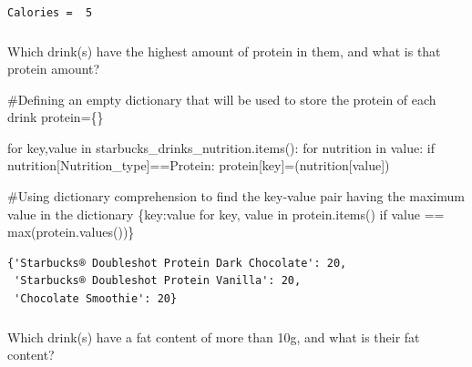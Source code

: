 \documentclass[
  letterpaper,
  DIV=11,
  numbers=noendperiod]{scrreprt}
\newenvironment{Shaded}{\begin{snugshade}}{\end{snugshade}}
\newcommand{\BuiltInTok}[1]{\textcolor[rgb]{0.00,0.23,0.31}{#1}}
\newcommand{\CommentTok}[1]{\textcolor[rgb]{0.37,0.37,0.37}{#1}}
\newcommand{\ControlFlowTok}[1]{\textcolor[rgb]{0.00,0.23,0.31}{#1}}
\newcommand{\KeywordTok}[1]{\textcolor[rgb]{0.00,0.23,0.31}{#1}}
\newcommand{\NormalTok}[1]{\textcolor[rgb]{0.00,0.23,0.31}{#1}}
\newcommand{\OperatorTok}[1]{\textcolor[rgb]{0.37,0.37,0.37}{#1}}
\newcommand{\StringTok}[1]{\textcolor[rgb]{0.13,0.47,0.30}{#1}}
\begin{document}
\begin{verbatim}
Calories =  5
\end{verbatim}

\hypertarget{section-17}{%
\subsubsection{}\label{section-17}}

Which drink(s) have the highest amount of protein in them, and what is
that protein amount?

\begin{Shaded}
\begin{Highlighting}[]
\CommentTok{\#Defining an empty dictionary that will be used to store the protein of each drink}
\NormalTok{protein}\OperatorTok{=}\NormalTok{\{\}}

\ControlFlowTok{for}\NormalTok{ key,value }\KeywordTok{in}\NormalTok{ starbucks\_drinks\_nutrition.items():}
    \ControlFlowTok{for}\NormalTok{ nutrition }\KeywordTok{in}\NormalTok{ value:        }
        \ControlFlowTok{if}\NormalTok{ nutrition[}\StringTok{\textquotesingle{}Nutrition\_type\textquotesingle{}}\NormalTok{]}\OperatorTok{==}\StringTok{\textquotesingle{}Protein\textquotesingle{}}\NormalTok{:}
\NormalTok{            protein[key]}\OperatorTok{=}\NormalTok{(nutrition[}\StringTok{\textquotesingle{}value\textquotesingle{}}\NormalTok{])}

\CommentTok{\#Using dictionary comprehension to find the key{-}value pair having the maximum value in the dictionary}
\NormalTok{\{key:value }\ControlFlowTok{for}\NormalTok{ key, value }\KeywordTok{in}\NormalTok{ protein.items() }\ControlFlowTok{if}\NormalTok{ value }\OperatorTok{==} \BuiltInTok{max}\NormalTok{(protein.values())\}}
\end{Highlighting}
\end{Shaded}

\begin{verbatim}
{'Starbucks® Doubleshot Protein Dark Chocolate': 20,
 'Starbucks® Doubleshot Protein Vanilla': 20,
 'Chocolate Smoothie': 20}
\end{verbatim}

\hypertarget{section-18}{%
\subsubsection{}\label{section-18}}

Which drink(s) have a fat content of more than 10g, and what is their
fat content?
\end{document}
